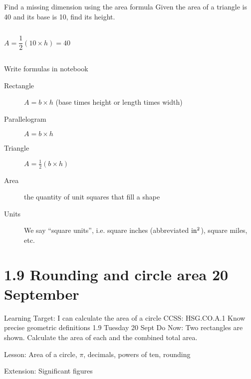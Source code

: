 \begin{frame}{Find a missing dimension using the area formula}
    Given the area of a triangle is 40 and its base is 10, find its height. \vspace{1cm}
    \begin{columns}
        $$A =  \frac{1}{2} (10 \times h) = 40$$
    \end{columns} \vspace{1.5cm}
    \end{frame}

\begin{frame}{Write formulas in notebook}
        \begin{description}
            \item[Rectangle] $A=b \times h$ (base times height or length times width)
            \item[Parallelogram] $A=b \times h$
            \item[Triangle] $A=\frac{1}{2} (b \times h)$ \vspace{0.5cm}
            \item[Area] the quantity of unit squares that fill a shape
            \item[Units] We say ``square units'', i.e. square inches (abbreviated $\rm{in}^2$), square miles, etc.
        \end{description}
    \end{frame}
    
\section{1.9 Rounding and circle area \hfill 20 September}
\begin{frame}{Learning Target: I can calculate the area of a circle}
    {CCSS: HSG.CO.A.1 Know precise geometric definitions \hfill \alert{1.9 Tuesday 20 Sept}}
        Do Now: Two rectangles are shown. Calculate the area of each and the combined total area.
        \begin{flushleft}
          \end{flushleft}
        Lesson: Area of a circle, $\pi$, decimals, powers of ten, rounding \par \medskip
        Extension: Significant figures
    \end{frame}


